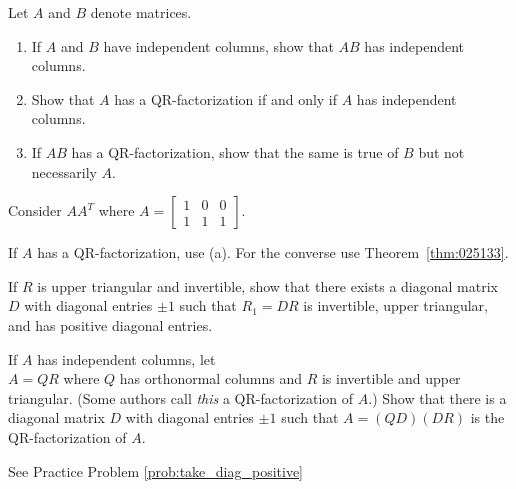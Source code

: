 \documentclass{ximera}
\begin{document}
\begin{problem}\label{prob:indcolumns}
Let $A$ and $B$ denote matrices.


\begin{enumerate} 
\item If $A$ and $B$ have independent columns, show that $AB$ has independent columns. %

\item Show that $A$ has a QR-factorization if and only if $A$ has independent columns.

\item If $AB$ has a QR-factorization, show that the same is true of $B$ but not necessarily $A$.
\end{enumerate}
\begin{hint}
Consider $AA^{T}$ where $A = \left[ \begin{array}{rrr}
1 & 0 & 0 \\
1 & 1 & 1
\end{array}\right]$.
\end{hint}
\begin{hint}
If $A$ has a QR-factorization, use (a). For the converse use Theorem~\ref{thm:025133}.
\end{hint}
\end{problem}

\begin{problem}\label{prob:take_diag_positive}
If $R$ is upper triangular and invertible, show that there exists a diagonal matrix $D$ with diagonal entries $\pm 1$ such that $R_{1} = DR$ is invertible, upper triangular, and has positive diagonal entries.
\end{problem}

\begin{problem}\label{prob:fullQR}
If $A$ has independent columns, let \\ $A = QR$ where $Q$ has orthonormal columns and $R$ is invertible and upper triangular. (Some authors call \textit{this} a QR-factorization of $A$.) Show that there is a diagonal matrix $D$ with diagonal entries $\pm 1$ such that $A = (QD)(DR)$ is the QR-factorization of $A$.
\begin{hint}
See Practice Problem \ref{prob:take_diag_positive}
\end{hint}
\end{problem}
\end{document}
